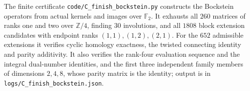 The finite certificate \texttt{code/C\_finish\_bockstein.py} constructs
the Bockstein operators from actual kernels and images over
$\mathbb F_2$. It exhausts all $260$ matrices of ranks one and two
over $\mathbb Z/4$, finding $30$ involutions, and all $1808$ block
extension candidates with endpoint ranks $(1,1),(1,2),(2,1)$.
For the $652$ admissible extensions it verifies cyclic homology
exactness, the twisted connecting identity and parity additivity.
It also verifies the rank-four evaluation sequence and the integral
dual-number identities, and the first three independent family members
of dimensions $2,4,8$, whose parity matrix is the identity; output is in
\texttt{logs/C\_finish\_bockstein.json}.
